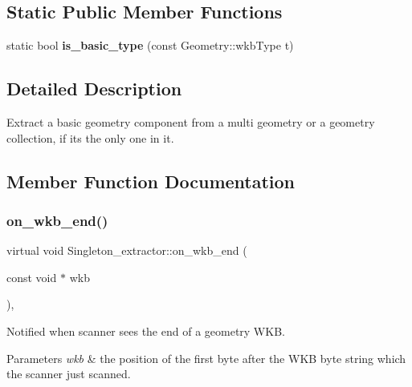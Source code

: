 \subsection*{Static Public Member Functions}
\begin{DoxyCompactItemize}
\item 
\mbox{\label{classSingleton__extractor_a46068c59e6879fb41fe4cec0e8117e84}} 
static bool {\bfseries is\+\_\+basic\+\_\+type} (const Geometry\+::wkb\+Type t)
\end{DoxyCompactItemize}


\subsection{Detailed Description}
Extract a basic geometry component from a multi geometry or a geometry collection, if it\textquotesingle{}s the only one in it. 

\subsection{Member Function Documentation}
\mbox{\label{classSingleton__extractor_af504a10c6a45262fb75907677fce3b56}} 
\subsubsection{\texorpdfstring{on\+\_\+wkb\+\_\+end()}{on\_wkb\_end()}}
{\footnotesize\ttfamily virtual void Singleton\+\_\+extractor\+::on\+\_\+wkb\+\_\+end (\begin{DoxyParamCaption}\item[{const void $\ast$}]{wkb }\end{DoxyParamCaption})\hspace{0.3cm}{\ttfamily [inline]}, {\ttfamily [virtual]}}

Notified when scanner sees the end of a geometry W\+KB. 
\begin{DoxyParams}{Parameters}
{\em wkb} & the position of the first byte after the W\+KB byte string which the scanner just scanned. \\
\hline
\end{DoxyParams}


